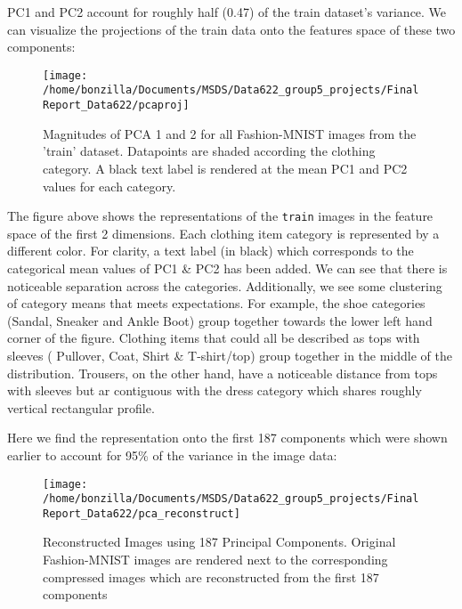 \documentclass{article}
\begin{document}
PC1 and PC2 account for roughly half (0.47) of the train dataset's
variance. We can visualize the projections of the train data onto the
features space of these two components:

\begin{figure}

{\centering \texttt{[image: /home/bonzilla/Documents/MSDS/Data622\_group5\_projects/FinalReport\_Data622/pcaproj]} 

}

\caption{Magnitudes of PCA 1 and 2 for all Fashion-MNIST images from the 'train' dataset. Datapoints are shaded according the clothing category. A black text label is rendered at the mean PC1 and PC2 values for each category.}\label{fig:unnamed-chunk-7}
\end{figure}

The figure above shows the representations of the \texttt{train} images
in the feature space of the first 2 dimensions. Each clothing item
category is represented by a different color. For clarity, a text label
(in black) which corresponds to the categorical mean values of PC1 \&
PC2 has been added. We can see that there is noticeable separation
across the categories. Additionally, we see some clustering of category
means that meets expectations. For example, the shoe categories (Sandal,
Sneaker and Ankle Boot) group together towards the lower left hand
corner of the figure. Clothing items that could all be described as tops
with sleeves ( Pullover, Coat, Shirt \& T-shirt/top) group together in
the middle of the distribution. Trousers, on the other hand, have a
noticeable distance from tops with sleeves but ar contiguous with the
dress category which shares roughly vertical rectangular profile.

Here we find the representation onto the first 187 components which were
shown earlier to account for 95\% of the variance in the image data:

\begin{figure}

{\centering \texttt{[image: /home/bonzilla/Documents/MSDS/Data622\_group5\_projects/FinalReport\_Data622/pca\_reconstruct]} 

}

\caption{Reconstructed Images using 187 Principal Components. Original Fashion-MNIST images are rendered next to the corresponding compressed images which are reconstructed from the first 187 components}\label{fig:unnamed-chunk-8}
\end{figure}
\end{document}
